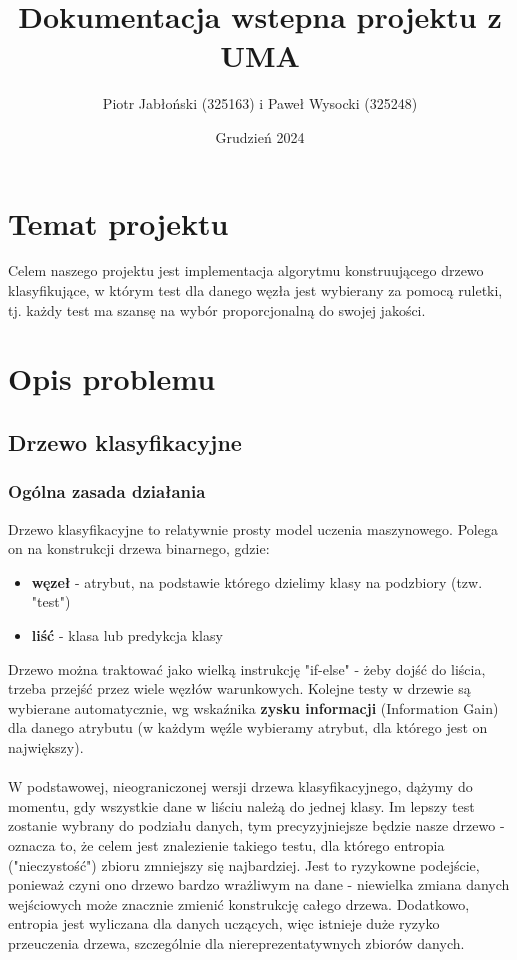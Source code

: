 \documentclass[11pt]{article}
\author{Piotr Jabłoński (325163) i Paweł Wysocki (325248)}
\date{Grudzień 2024}
\title{Dokumentacja wstepna projektu z UMA}
\begin{document}
\maketitle
\tableofcontents

\pagebreak
\section{Temat projektu}
\label{sec:org004bb5c}
Celem naszego projektu jest implementacja algorytmu konstruującego drzewo klasyfikujące, w którym test dla danego węzła jest wybierany za pomocą ruletki, tj. każdy test ma szansę na wybór proporcjonalną do swojej jakości.
\section{Opis problemu}
\label{sec:org19cc40d}

\subsection{Drzewo klasyfikacyjne}
\label{sec:orgdbf1c0f}

\subsubsection{Ogólna zasada działania}

Drzewo klasyfikacyjne to relatywnie prosty model uczenia maszynowego. Polega on na konstrukcji drzewa binarnego, gdzie:
\begin{itemize}
\item \textbf{węzeł} - atrybut, na podstawie którego dzielimy klasy na podzbiory (tzw. "test")
\item \textbf{liść} - klasa lub predykcja klasy
\end{itemize}
Drzewo można traktować jako wielką instrukcję "if-else" - żeby dojść do liścia, trzeba przejść przez wiele węzłów warunkowych. Kolejne testy w drzewie są wybierane automatycznie, wg wskaźnika \textbf{zysku informacji} (Information Gain) dla danego atrybutu (w każdym węźle wybieramy atrybut, dla którego jest on największy).\\\\
W podstawowej, nieograniczonej wersji drzewa klasyfikacyjnego, dążymy do momentu, gdy wszystkie dane w liściu należą do jednej klasy. Im lepszy test zostanie wybrany do podziału danych, tym precyzyjniejsze będzie nasze drzewo - oznacza to, że celem jest znalezienie takiego testu, dla którego entropia ("nieczystość") zbioru zmniejszy się najbardziej. Jest to ryzykowne podejście, ponieważ czyni ono drzewo bardzo wrażliwym na dane - niewielka zmiana danych wejściowych może znacznie zmienić konstrukcję całego drzewa. Dodatkowo, entropia jest wyliczana dla danych uczących, więc istnieje duże ryzyko przeuczenia drzewa, szczególnie dla niereprezentatywnych zbiorów danych.
\end{document}
